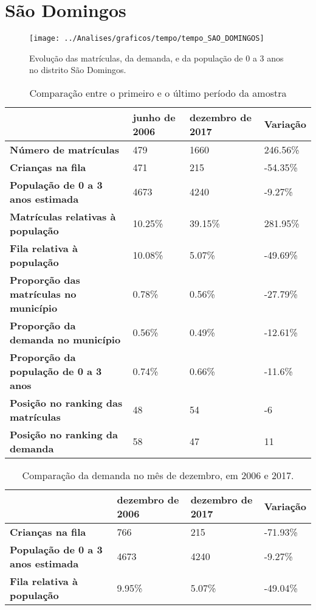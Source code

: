 \section{São Domingos}
\begin{figure}[H]
\centering
\texttt{[image: ../Analises/graficos/tempo/tempo\_SAO\_DOMINGOS]}
\caption{Evolução das matrículas, da demanda, e da população de 0 a 3 anos no distrito São Domingos.}
\end{figure}
\begin{table}[H]
\begin{tabular}{|l|l|l|l|}
\hline
\textbf{}                                      & \textbf{junho de 2006}       & \textbf{dezembro de 2017}    & \textbf{Variação} \\ \hline
\textbf{Número de matrículas}                  & 479 & 1660 & 246.56\% \\ \hline
\textbf{Crianças na fila}                      & 471 & 215 & -54.35\% \\ \hline
\textbf{População de 0 a 3 anos estimada}      & 4673 & 4240 & -9.27\% \\ \hline
\textbf{Matrículas relativas à população}      & 10.25\% & 39.15\% & 281.95\% \\ \hline
\textbf{Fila relativa à população}             & 10.08\% & 5.07\% & -49.69\% \\ \hline
\textbf{Proporção das matrículas no município} & 0.78\% & 0.56\% & -27.79\% \\ \hline
\textbf{Proporção da demanda no município}     & 0.56\% & 0.49\% & -12.61\% \\ \hline
\textbf{Proporção da população de 0 a 3 anos}  & 0.74\% & 0.66\% & -11.6\% \\ \hline
\textbf{Posição no ranking das matrículas}     & 48 & 54 & -6 \\ \hline
\textbf{Posição no ranking da demanda}         & 58 & 47 & 11 \\ \hline
\end{tabular}
\caption{Comparação entre o primeiro e o último período da amostra}
\end{table}
\begin{table}[H]
\begin{tabular}{|l|l|l|l|}
\hline
\textbf{}                                 & \textbf{dezembro de 2006} & \textbf{dezembro de 2017} & \textbf{Variação} \\ \hline
\textbf{Crianças na fila}                      & 766 & 215 & -71.93\% \\ \hline
\textbf{População de 0 a 3 anos estimada}      & 4673 & 4240 & -9.27\% \\ \hline
\textbf{Fila relativa à população}             & 9.95\% & 5.07\% & -49.04\% \\ \hline
\end{tabular}
\caption{Comparação da demanda no mês de dezembro, em 2006 e 2017.}
\end{table}
